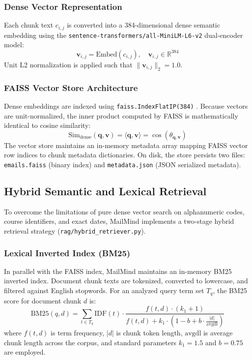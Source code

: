 \documentclass[11pt,a4paper]{article}
\begin{document}
\subsubsection{Dense Vector Representation}
Each chunk text $c_{i,j}$ is converted into a 384-dimensional dense semantic embedding using the \texttt{sentence-transformers/all-MiniLM-L6-v2} dual-encoder model:
\begin{equation}
    \mathbf{v}_{i,j} = \text{Embed}(c_{i,j}), \quad \mathbf{v}_{i,j} \in \mathbb{R}^{384}
\end{equation}
Unit L2 normalization is applied such that $\|\mathbf{v}_{i,j}\|_2 = 1.0$.

\subsubsection{FAISS Vector Store Architecture}
Dense embeddings are indexed using \texttt{faiss.IndexFlatIP(384)} \cite{johnson2021billion}. Because vectors are unit-normalized, the inner product computed by FAISS is mathematically identical to cosine similarity:
\begin{equation}
    \text{Sim}_{\text{dense}}(\mathbf{q}, \mathbf{v}) = \langle \mathbf{q}, \mathbf{v} \rangle = \cos(\theta_{\mathbf{q}, \mathbf{v}})
\end{equation}
The vector store maintains an in-memory metadata array mapping FAISS vector row indices to chunk metadata dictionaries. On disk, the store persists two files: \texttt{emails.faiss} (binary index) and \texttt{metadata.json} (JSON serialized metadata).

\subsection{Hybrid Semantic and Lexical Retrieval}
To overcome the limitations of pure dense vector search on alphanumeric codes, course identifiers, and exact dates, MailMind implements a two-stage hybrid retrieval strategy (\texttt{rag/hybrid\_retriever.py}).

\subsubsection{Lexical Inverted Index (BM25)}
In parallel with the FAISS index, MailMind maintains an in-memory BM25 inverted index. Document chunk texts are tokenized, converted to lowercase, and filtered against English stopwords. For an analyzed query term set $T_q$, the BM25 score for document chunk $d$ is:
\begin{equation}
    \text{BM25}(q, d) = \sum_{t \in T_q} \text{IDF}(t) \cdot \frac{f(t, d) \cdot (k_1 + 1)}{f(t, d) + k_1 \cdot \left(1 - b + b \cdot \frac{|d|}{\text{avgdl}}\right)}
\end{equation}
where $f(t, d)$ is term frequency, $|d|$ is chunk token length, $\text{avgdl}$ is average chunk length across the corpus, and standard parameters $k_1 = 1.5$ and $b = 0.75$ are employed.
\end{document}
